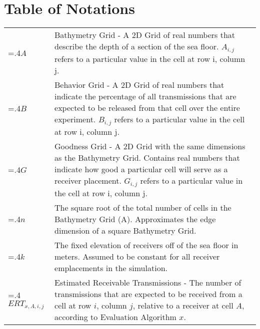 
\chapter{Table of Notations}
\noindent\begin{tabularx}{\linewidth}{@{}>{\hsize=.4\hsize}X>{\hsize=1.5\hsize}X@{}}
	
	$A$ & Bathymetry Grid - A 2D Grid of real numbers that describe the depth of a section of the sea floor.  $A_{i,j}$ refers to a particular value in the cell at row i, column j.\\

	$B$ & Behavior Grid - A 2D Grid of real numbers that indicate the percentage of all transmissions that are expected to be released from that cell over the entire experiment.  $B_{i,j}$ refers to a particular value in the cell at row i, column j.\\
	
	$G$ & Goodness Grid - A 2D Grid with the same dimensions as the Bathymetry Grid.  Contains real numbers that indicate how good a particular cell will serve as a receiver placement.  $G_{i,j}$ refers to a particular value in the cell at row i, column j.\\

	$n$ & The square root of the total number of cells in the Bathymetry Grid (A).  Approximates the edge dimension of a square Bathymetry Grid.\\

	$k$ & The fixed elevation of receivers off of the sea floor in meters.  Assumed to be constant for all receiver emplacements in the simulation.\\
	
	$ERT_{x,A,i,j}$ & Estimated Receivable Transmissions - The number of transmissions that are expected to be received from a cell at row $i$, column $j$, relative to a receiver at cell $A$, according to Evaluation Algorithm $x$.\\


\end{tabularx}
